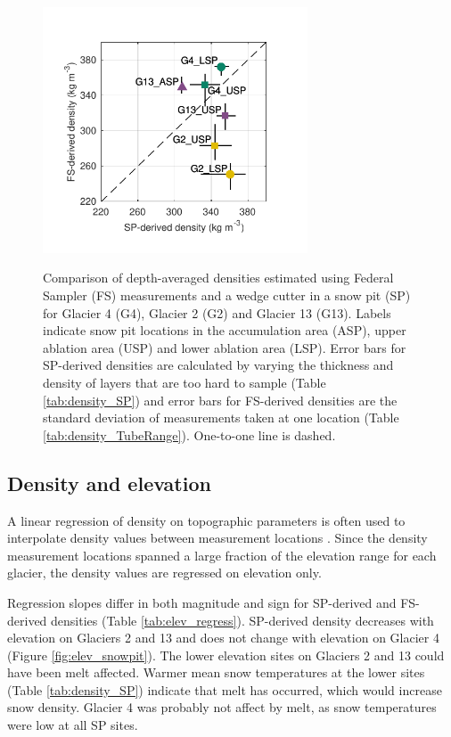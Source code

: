 \documentclass{sfuthesis}
\begin{document}
{\begin{figure}[H]
	\centering
	\includegraphics[width =0.7\textwidth]{SPvsFS.pdf}\\
	\caption[Comparison of depth-averaged densities estimated using Federal Sampler (FS) measurements and a wedge cutter in a snow pit (SP) for study glaciers]{Comparison of depth-averaged densities estimated using Federal Sampler (FS) measurements and a wedge cutter in a snow pit (SP) for Glacier 4 (G4), Glacier 2 (G2) and Glacier 13 (G13). Labels indicate snow pit locations in the accumulation area (ASP), upper ablation area (USP) and lower ablation area (LSP). Error bars for SP-derived densities are calculated by varying the thickness and density of layers that are too hard to sample (Table \ref{tab:density_SP}) and error bars for FS-derived densities are the standard deviation of measurements taken at one location (Table \ref{tab:density_TubeRange}). One-to-one line is dashed.}
	\label{fig:density_pitVStube}
\end{figure}


\subsection{Density and elevation}

A linear regression of density on topographic parameters is often used to interpolate density values between measurement locations \citep[e.g.][]{Elder1998, Molotch2005,Wetlaufer2016}. Since the density measurement locations spanned a large fraction of the elevation range for each glacier, the density values are regressed on elevation only. 

Regression slopes differ in both magnitude and sign for SP-derived and FS-derived densities (Table \ref{tab:elev_regress}). SP-derived density decreases with elevation on Glaciers 2 and 13 and does not change with elevation on Glacier 4 (Figure \ref{fig:elev_snowpit}). The lower elevation sites on Glaciers 2 and 13 could have been melt affected. Warmer mean snow temperatures at the lower sites (Table \ref{tab:density_SP}) indicate that melt has occurred, which would increase snow density. Glacier 4 was probably not affect by melt, as snow temperatures were low at all SP sites. 

}
\end{document}
